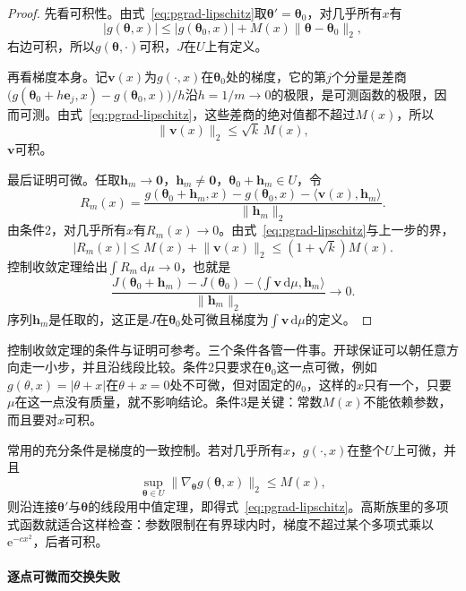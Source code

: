 \begin{proof}
先看可积性。由式~\eqref{eq:pgrad-lipschitz}取$\bm{\theta}'=\bm{\theta}_{0}$，对几乎所有$x$有
\[
  \lvert g(\bm{\theta},x)\rvert\leq\lvert g(\bm{\theta}_{0},x)\rvert+M(x)\lVert\bm{\theta}-\bm{\theta}_{0}\rVert_{2},
\]
右边可积，所以$g(\bm{\theta},\cdot)$可积，$J$在$U$上有定义。

再看梯度本身。记$\bm{v}(x)$为$g(\cdot,x)$在$\bm{\theta}_{0}$处的梯度，它的第$j$个分量是差商$\bigl(g(\bm{\theta}_{0}+h\bm{e}_{j},x)-g(\bm{\theta}_{0},x)\bigr)/h$沿$h=1/m\to0$的极限，是可测函数的极限，因而可测。由式~\eqref{eq:pgrad-lipschitz}，这些差商的绝对值都不超过$M(x)$，所以
\[
  \lVert\bm{v}(x)\rVert_{2}\leq\sqrt{k}\,M(x),
\]
$\bm{v}$可积。

最后证明可微。任取$\bm{h}_{m}\to\bm{0}$，$\bm{h}_{m}\neq\bm{0}$，$\bm{\theta}_{0}+\bm{h}_{m}\in U$，令
\[
  R_{m}(x)=\frac{g(\bm{\theta}_{0}+\bm{h}_{m},x)-g(\bm{\theta}_{0},x)-\langle\bm{v}(x),\bm{h}_{m}\rangle}{\lVert\bm{h}_{m}\rVert_{2}}.
\]
由条件2，对几乎所有$x$有$R_{m}(x)\to0$。由式~\eqref{eq:pgrad-lipschitz}与上一步的界，
\[
  \lvert R_{m}(x)\rvert\leq M(x)+\lVert\bm{v}(x)\rVert_{2}\leq(1+\sqrt{k})M(x).
\]
控制收敛定理给出$\int R_{m}\,\mathrm{d}\mu\to0$，也就是
\[
  \frac{J(\bm{\theta}_{0}+\bm{h}_{m})-J(\bm{\theta}_{0})-\bigl\langle\int\bm{v}\,\mathrm{d}\mu,\bm{h}_{m}\bigr\rangle}{\lVert\bm{h}_{m}\rVert_{2}}\to0 .
\]
序列$\bm{h}_{m}$是任取的，这正是$J$在$\bm{\theta}_{0}$处可微且梯度为$\int\bm{v}\,\mathrm{d}\mu$的定义。
\end{proof}

控制收敛定理的条件与证明可参考。三个条件各管一件事。开球保证可以朝任意方向走一小步，并且沿线段比较。条件2只要求在$\bm{\theta}_{0}$这一点可微，例如$g(\theta,x)=\lvert\theta+x\rvert$在$\theta+x=0$处不可微，但对固定的$\theta_{0}$，这样的$x$只有一个，只要$\mu$在这一点没有质量，就不影响结论。条件3是关键：常数$M(x)$不能依赖参数，而且要对$x$可积。

常用的充分条件是梯度的一致控制。若对几乎所有$x$，$g(\cdot,x)$在整个$U$上可微，并且
\[
  \sup_{\bm{\theta}\in U}\lVert\nabla_{\bm{\theta}}g(\bm{\theta},x)\rVert_{2}\leq M(x),
\]
则沿连接$\bm{\theta}'$与$\bm{\theta}$的线段用中值定理，即得式~\eqref{eq:pgrad-lipschitz}。高斯族里的多项式函数就适合这样检查：参数限制在有界球内时，梯度不超过某个多项式乘以$\mathrm{e}^{-cx^{2}}$，后者可积。

\paragraph{逐点可微而交换失败}

